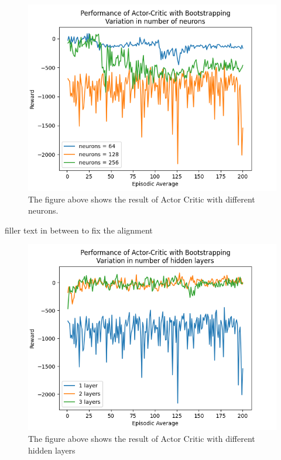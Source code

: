 \documentclass{article}
\begin{document}
\begin{figure}[htbp]
\centering
\includegraphics[width=0.9\linewidth]{Report/images/Performance_of_Actor_Critic_BS_Neurons.png}
\caption{\label{fig:ActorCritic for different Neurons}The figure above shows the result of Actor Critic with different neurons. }
\end{figure}
filler text in between to fix the alignment
\begin{figure}[htbp]
\centering
\includegraphics[width=0.9\linewidth]{Report/images/Performance_of_Actor_Critic_BS_Layers.png}
\caption{\label{fig:ActorCritic for different Hidden Layers}The figure above shows the result of Actor Critic with different hidden layers}
\end{figure}
\end{document}
